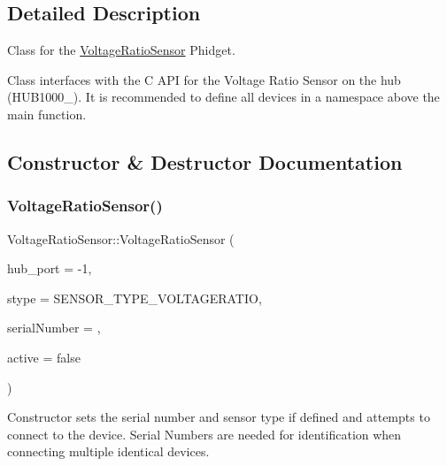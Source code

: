 \subsection{Detailed Description}
Class for the \hyperlink{classVoltageRatioSensor}{Voltage\+Ratio\+Sensor} Phidget. 

Class interfaces with the C A\+PI for the Voltage Ratio Sensor on the hub (H\+U\+B1000\+\_). It is recommended to define all devices in a namespace above the main function. 

\subsection{Constructor \& Destructor Documentation}
\mbox{\label{classVoltageRatioSensor_a63e3c21125ddff16315f95fa62b8ff9c}} 
\subsubsection{\texorpdfstring{Voltage\+Ratio\+Sensor()}{VoltageRatioSensor()}}
{\footnotesize\ttfamily Voltage\+Ratio\+Sensor\+::\+Voltage\+Ratio\+Sensor (\begin{DoxyParamCaption}\item[{int}]{hub\+\_\+port = {\ttfamily -\/1},  }\item[{Phidget\+Voltage\+Ratio\+Input\+\_\+\+Sensor\+Type}]{stype = {\ttfamily SENSOR\+\_\+TYPE\+\_\+VOLTAGERATIO},  }\item[{int}]{serial\+Number = {},  }\item[{bool}]{active = {\ttfamily false} }\end{DoxyParamCaption})\hspace{0.3cm}{\ttfamily [inline]}}

Constructor sets the serial number and sensor type if defined and attempts to connect to the device. Serial Numbers are needed for identification when connecting multiple identical devices.\mbox{\label{classVoltageRatioSensor_ac0e023b5d45eec27ab92add6924b083b}} 
